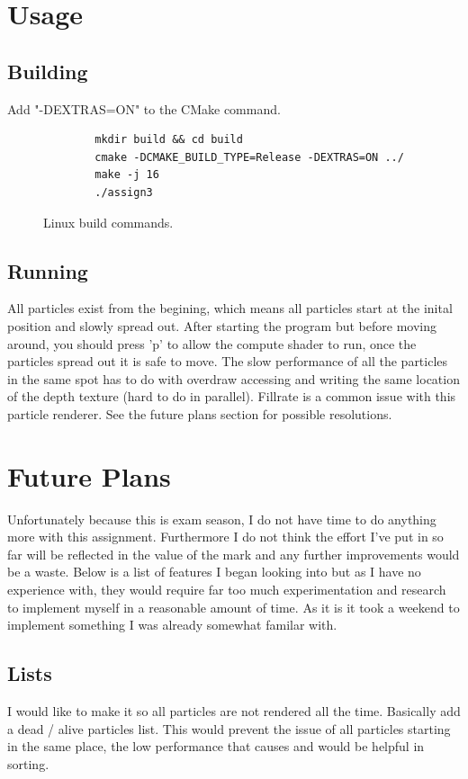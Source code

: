 \documentclass[]{report}
\begin{document}
\section{Usage}
\subsection{Building}
Add "-DEXTRAS=ON" to the CMake command.
\begin{figure}[H]
	\centering
	\begin{verbatim}
		mkdir build && cd build
		cmake -DCMAKE_BUILD_TYPE=Release -DEXTRAS=ON ../
		make -j 16
		./assign3
	\end{verbatim}
	\caption{Linux build commands.}
\end{figure}
\subsection{Running}
All particles exist from the begining, which means all particles start at the inital position and slowly spread out. After starting the program but before moving around, you should press 'p' to allow the compute shader to run, once the particles spread out it is safe to move. The slow performance of all the particles in the same spot has to do with overdraw accessing and writing the same location of the depth texture (hard to do in parallel). Fillrate is a common issue with this particle renderer. See the future plans section for possible resolutions.

\section{Future Plans}\label{sec:fp}
Unfortunately because this is exam season, I do not have time to do anything more with this assignment. Furthermore I do not think the effort I've put in so far will be reflected in the value of the mark and any further improvements would be a waste. Below is a list of features I began looking into but as I have no experience with, they would require far too much experimentation and research to implement myself in a reasonable amount of time. As it is it took a weekend to implement something I was already somewhat familar with. 
\subsection{Lists}
I would like to make it so all particles are not rendered all the time. Basically add a dead / alive particles list. This would prevent the issue of all particles starting in the same place, the low performance that causes and would be helpful in sorting.
\end{document}
